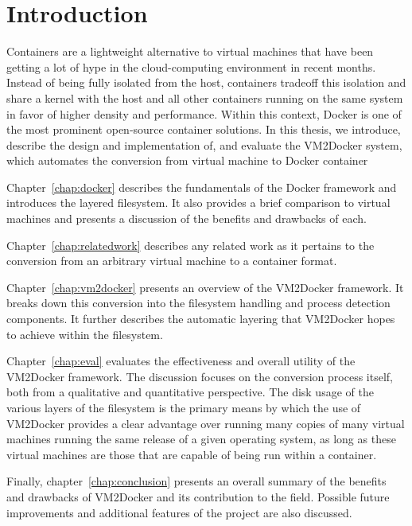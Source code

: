 \chapter{Introduction}

Containers are a lightweight alternative to virtual machines that have been getting a lot of hype in the cloud-computing environment in recent months. Instead of being fully isolated from the host, containers tradeoff this isolation and share a kernel with the host and all other containers running on the same system in favor of higher density and performance. Within this context, Docker is one of the most prominent open-source container solutions. In this thesis, we introduce, describe the design and implementation of, and evaluate the VM2Docker system, which automates the conversion from virtual machine to Docker container

Chapter~\ref{chap:docker} describes the fundamentals of the Docker framework and introduces the layered filesystem. It also provides a brief comparison to virtual machines and presents a discussion of the benefits and drawbacks of each.

Chapter~\ref{chap:relatedwork} describes any related work as it pertains to the conversion from an arbitrary virtual machine to a container format.

Chapter~\ref{chap:vm2docker} presents an overview of the VM2Docker framework. It breaks down this conversion into the filesystem handling and process detection components. It further describes the automatic layering that VM2Docker hopes to achieve within the filesystem.

Chapter~\ref{chap:eval} evaluates the effectiveness and overall utility of the VM2Docker framework. The discussion focuses on the conversion process itself, both from a qualitative and quantitative perspective. The disk usage of the various layers of the filesystem is the primary means by which the use of VM2Docker provides a clear advantage over running many copies of many virtual machines running the same release of a given operating system, as long as these virtual machines are those that are capable of being run within a container.

Finally, chapter~\ref{chap:conclusion} presents an overall summary of the benefits and drawbacks of VM2Docker and its contribution to the field. Possible future improvements and additional features of the project are also discussed.